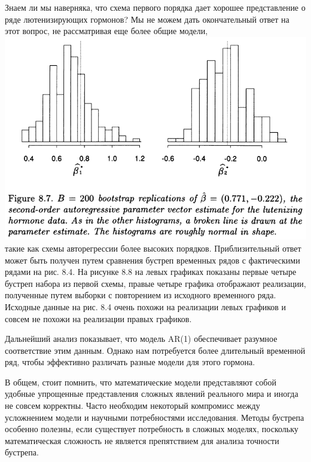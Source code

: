 Знаем ли мы наверняка, что схема первого порядка дает хорошее представление о ряде лютенизирующих гормонов? Мы не можем дать окончательный ответ на этот вопрос, не рассматривая еще более общие модели,
\noindent
\includegraphics[width=\linewidth]{8/f87}
\newline
такие как схемы авторегрессии более высоких порядков. Приблизительный ответ может быть получен путем сравнения бустреп временных рядов с фактическими рядами на рис. 8.4. На рисунке 8.8 на левых графиках показаны первые четыре бустреп набора из первой схемы, правые четыре графика отображают реализации, полученные путем выборки с повторением из исходного временного ряда. Исходные данные на рис. 8.4 очень похожи на реализации левых графиков и совсем не похожи на реализации правых графиков.

Дальнейший анализ показывает, что модель AR(1) обеспечивает разумное соответствие этим данным. Однако нам потребуется более длительный временной ряд, чтобы эффективно различать разные модели для этого гормона.

В общем, стоит помнить, что математические модели представляют собой удобные упрощенные представления сложных явлений реального мира и иногда не совсем корректны. Часто необходим некоторый компромисс между усложнением модели и научными потребностями исследования. Методы бустрепа особенно полезны, если существует потребность в сложных моделях, поскольку математическая сложность не является препятствием для анализа точности бустрепа.\\